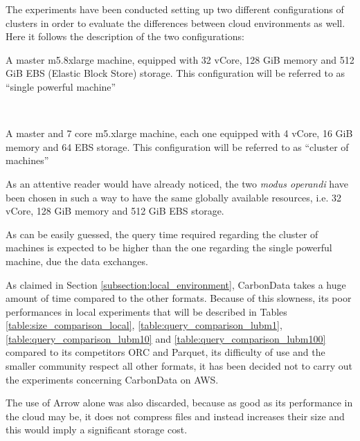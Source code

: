 \documentclass[10pt, a4paper]{report}
\begin{document}
The experiments have been conducted setting up two different configurations of clusters in order to evaluate the differences between cloud environments as well. Here it follows the description of the two configurations: \\

\begin{itemize}
	\begin{minipage}{0.92\textwidth}
		\item A master m5.8xlarge machine, equipped with 32 vCore, 128 GiB memory and 512 GiB EBS\cite{aws_ebs} (Elastic Block Store) storage. This configuration will be referred to as ``single powerful machine'' \\
	\end{minipage} \\
	\begin{minipage}{0.92\textwidth}
		\item A master and 7 core m5.xlarge machine, each one equipped with 4 vCore, 16 GiB memory and 64 EBS storage. This configuration will be referred to as ``cluster of machines'' \\
	\end{minipage}
\end{itemize}

As an attentive reader would have already noticed, the two \textit{modus operandi} have been chosen in such a way to have the same globally available resources, i.e. 32 vCore, 128 GiB memory and 512 GiB EBS storage.

As can be easily guessed, the query time required regarding the cluster of machines is expected to be higher than the one regarding the single powerful machine, due the data exchanges.

As claimed in Section \ref{subsection:local_environment}, CarbonData takes a huge amount of time compared to the other formats. Because of this slowness, its poor performances in local experiments that will be described in Tables \ref{table:size_comparison_local}, \ref{table:query_comparison_lubm1}, \ref{table:query_comparison_lubm10} and \ref{table:query_comparison_lubm100} compared to its competitors ORC and Parquet, its difficulty of use and the smaller community respect all other formats, it has been decided not to carry out the experiments concerning CarbonData on AWS.

The use of Arrow alone was also discarded, because as good as its performance in the cloud may be, it does not compress files and instead increases their size and this would imply a significant storage cost.
\end{document}
